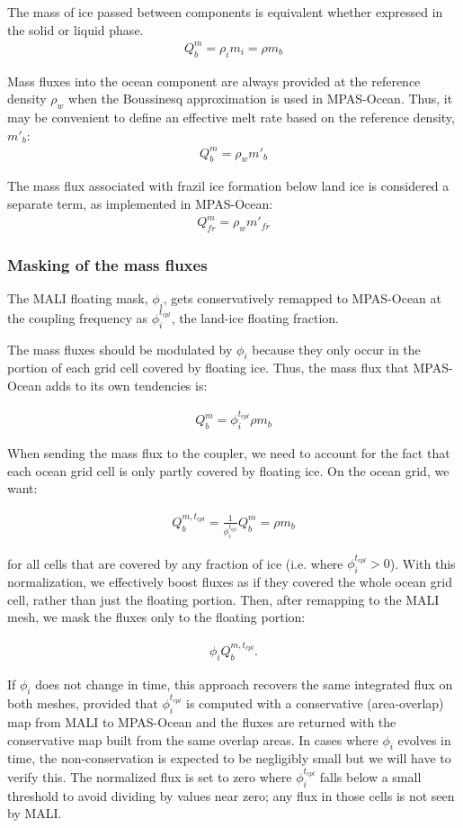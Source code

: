 \documentclass[11pt]{report}
\newcommand{\bea}{\begin{eqnarray}}
\newcommand{\eea}{\end{eqnarray}}
\begin{document}
The mass of ice passed between components is equivalent whether expressed in the solid or liquid phase.
\bea
    Q_b^m = \rho_i m_i = \rho m_b
\eea

Mass fluxes into the ocean component are always provided at the reference density $\rho_w$ when the Boussinesq approximation is used in MPAS-Ocean. Thus, it may be convenient to define an effective melt rate based on the reference density, $m'_b$:
\bea
    Q_b^m = \rho_w m'_b
\eea

The mass flux associated with frazil ice formation below land ice is considered a separate term, as implemented in MPAS-Ocean:
\bea
    Q_{fr}^m = \rho_w m'_{fr}
\eea


\subsubsection{Masking of the mass fluxes}

The MALI floating mask, $\phi_i$, gets conservatively remapped to MPAS-Ocean at the coupling frequency as $\phi_i^{t_{cpl}}$, the land-ice floating fraction.

The mass fluxes should be modulated by $\phi_i$ because they only occur in the portion of each grid cell covered by floating ice.  Thus, the mass flux that MPAS-Ocean adds to its own tendencies is:

\bea
    Q_b^m = \phi_i^{t_{cpl}} \rho m_b
\eea

When sending the mass flux to the coupler, we need to account for the fact that each ocean grid cell is only partly covered by floating ice.  On the ocean grid, we want:

\bea
    Q_b^{m,t_{cpl}} = \frac{1}{\phi_i^{t_{cpl}}} Q_b^m = \rho m_b
\eea

for all cells that are covered by any fraction of ice (i.e. where $\phi_i^{t_{cpl}} > 0$).  With this normalization, we effectively boost fluxes as if they covered the whole ocean grid cell, rather than just the floating portion. Then, after remapping to the MALI mesh, we mask the fluxes only to the floating portion:

\bea
    \phi_i Q_b^{m,t_{cpl}}.
\eea

If $\phi_i$ does not change in time, this approach recovers the same integrated flux on both meshes, provided that $\phi_i^{t_{cpl}}$ is computed with a conservative (area-overlap) map from MALI to MPAS-Ocean and the fluxes are returned with the conservative map built from the same overlap areas.  In cases where $\phi_i$ evolves in time, the non-conservation is expected to be negligibly small but we will have to verify this.  The normalized flux is set to zero where $\phi_i^{t_{cpl}}$ falls below a small threshold to avoid dividing by values near zero; any flux in those cells is not seen by MALI.
\end{document}
